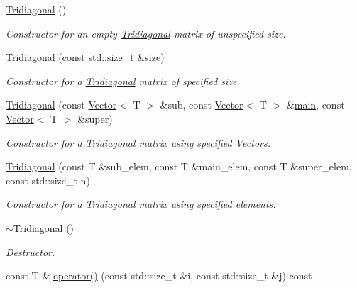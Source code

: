 \begin{DoxyCompactItemize}
\item 
\hyperlink{classLuna_1_1Tridiagonal_a749d1915ad40623c14046c690c6f16af}{Tridiagonal} ()
\begin{DoxyCompactList}\small\item\em Constructor for an empty \hyperlink{classLuna_1_1Tridiagonal}{Tridiagonal} matrix of unspecified size. \end{DoxyCompactList}\item 
\hyperlink{classLuna_1_1Tridiagonal_a34075ccfbb407b9f29e9f867813d1958}{Tridiagonal} (const std\+::size\+\_\+t \&\hyperlink{classLuna_1_1Tridiagonal_ae8586e82968a8c28f7c50008e1f75411}{size})
\begin{DoxyCompactList}\small\item\em Constructor for a \hyperlink{classLuna_1_1Tridiagonal}{Tridiagonal} matrix of specified size. \end{DoxyCompactList}\item 
\hyperlink{classLuna_1_1Tridiagonal_ab723eb17bd32e82fb6e27e2170b4cccc}{Tridiagonal} (const \hyperlink{classLuna_1_1Vector}{Vector}$<$ T $>$ \&sub, const \hyperlink{classLuna_1_1Vector}{Vector}$<$ T $>$ \&\hyperlink{Vector__algebra_8cpp_ae66f6b31b5ad750f1fe042a706a4e3d4}{main}, const \hyperlink{classLuna_1_1Vector}{Vector}$<$ T $>$ \&super)
\begin{DoxyCompactList}\small\item\em Constructor for a \hyperlink{classLuna_1_1Tridiagonal}{Tridiagonal} matrix using specified Vectors. \end{DoxyCompactList}\item 
\hyperlink{classLuna_1_1Tridiagonal_a43f06132888b27c66355ac7971089947}{Tridiagonal} (const T \&sub\+\_\+elem, const T \&main\+\_\+elem, const T \&super\+\_\+elem, const std\+::size\+\_\+t n)
\begin{DoxyCompactList}\small\item\em Constructor for a \hyperlink{classLuna_1_1Tridiagonal}{Tridiagonal} matrix using specified elements. \end{DoxyCompactList}\item 
\hyperlink{classLuna_1_1Tridiagonal_a9051546ef7a37559b1edff2a48d9741c}{$\sim$\+Tridiagonal} ()
\begin{DoxyCompactList}\small\item\em Destructor. \end{DoxyCompactList}\item 
const T \& \hyperlink{classLuna_1_1Tridiagonal_aa94d8c34b275eb5f6de7a840b78b843f}{operator()} (const std\+::size\+\_\+t \&i, const std\+::size\+\_\+t \&j) const

\end{DoxyCompactItemize}
